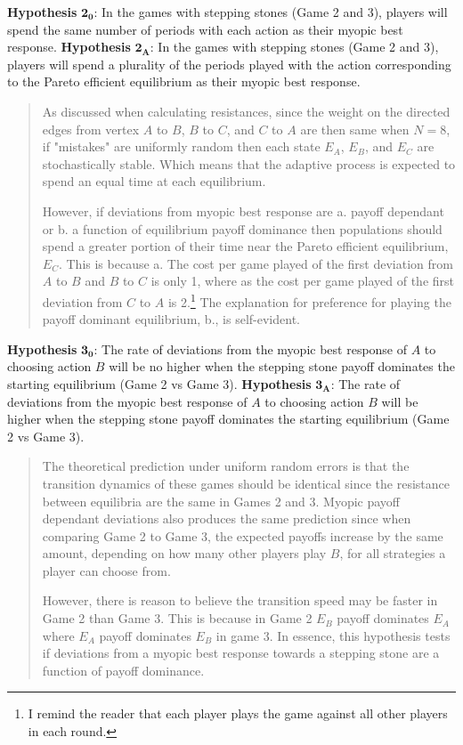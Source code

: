 \vskip12pt
\noindent
\textbf{Hypothesis} $\boldsymbol{2_0}$: In the games with stepping stones (Game 2 and 3), players will spend the same number of periods with each action as their myopic best response. 
\vskip6pt
\noindent
\textbf{Hypothesis} $\boldsymbol{2_A}$: In the games with stepping stones (Game 2 and 3), players will spend a plurality of the periods played with the action corresponding to the Pareto efficient equilibrium as their myopic best response.

\begin{quote}
As discussed when calculating resistances, since the weight on the directed edges from vertex $A$ to $B$, $B$ to $C$, and $C$ to $A$ are then same when $N = 8$, if "mistakes" are uniformly random then each state $E_A$, $E_B$, and $E_C$ are stochastically stable. Which means that the adaptive process is expected to spend an equal time at each equilibrium.

However, if deviations from myopic best response are a. payoff dependant or b. a function of equilibrium payoff dominance then populations should spend a greater portion of their time near the Pareto efficient equilibrium, $E_C$. This is because a. The cost per game played of the first deviation from $A$ to $B$ and $B$ to $C$ is only 1, where as the cost per game played of the first deviation from $C$ to $A$ is 2.\footnote{I remind the reader that each player plays the game against all other players in each round.} The explanation for preference for playing the payoff dominant equilibrium, b., is self-evident.

\end{quote}

\vskip12pt
\noindent
\textbf{Hypothesis} $\boldsymbol{3_0}$: The rate of deviations from the myopic best response of $A$ to choosing action $B$ will be no higher when the stepping stone payoff dominates the starting equilibrium (Game 2 vs Game 3).
\vskip6pt
\noindent
\textbf{Hypothesis} $\boldsymbol{3_A}$: The rate of deviations from the myopic best response of $A$ to choosing action $B$ will be higher when the stepping stone payoff dominates the starting equilibrium (Game 2 vs Game 3). 

\begin{quote}

The theoretical prediction under uniform random errors is that the transition dynamics of these games should be identical since the resistance between equilibria are the same in Games 2 and 3. Myopic payoff dependant deviations also produces the same prediction since when comparing Game 2 to Game 3, the expected payoffs increase by the same amount, depending on how many other players play $B$, for all strategies a player can choose from. 

However, there is reason to believe the transition speed may be faster in Game 2 than Game 3. This is because in Game 2 $E_B$ payoff dominates $E_A$ where $E_A$ payoff dominates $E_B$ in game 3. In essence, this hypothesis tests if deviations from a myopic best response towards a stepping stone are a function of payoff dominance.

\end{quote}

